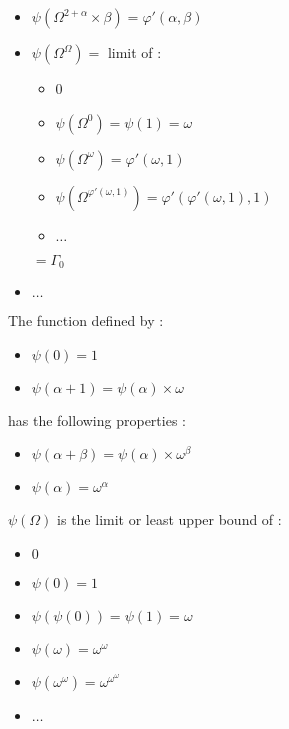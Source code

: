 \documentclass[10pt]{article}
\begin{document}
\begin{itemize}
\item \( \psi(\Omega^{2+\alpha} \times \beta) = \varphi'(\alpha,\beta) \)
\item \( \psi(\Omega^\Omega) = \) limit of : 
   \begin{itemize}
     \setlength{\itemsep}{1pt}
     \setlength{\parskip}{0pt}
     \setlength{\parsep}{0pt}
   \item 0
   \item \( \psi(\Omega^0) = \psi(1) = \omega \)
   \item \( \psi(\Omega^\omega) = \varphi'(\omega,1) \)
   \item \( \psi(\Omega^{\varphi'(\omega,1)}) = \varphi'(\varphi'(\omega,1),1) \)
   \item \( \ldots \)
   \end{itemize} 
   \( = \Gamma_0 \)
\item \( \ldots \)
\end{itemize}

\bigskip

The function defined by :

\begin{itemize}
     \setlength{\itemsep}{1pt}
     \setlength{\parskip}{0pt}
     \setlength{\parsep}{0pt}
\item \( \psi(0) = 1 \)
\item \( \psi(\alpha+1) = \psi(\alpha) \times \omega \)
\end{itemize}

has the following properties :

\begin{itemize}
     \setlength{\itemsep}{1pt}
     \setlength{\parskip}{0pt}
     \setlength{\parsep}{0pt}
\item \( \psi(\alpha+\beta)=\psi(\alpha) \times \omega^\beta \)
\item \( \psi(\alpha) = \omega^\alpha \)
\end{itemize}

\( \psi(\Omega) \) is the limit or least upper bound of :

\begin{itemize}
     \setlength{\itemsep}{1pt}
     \setlength{\parskip}{0pt}
     \setlength{\parsep}{0pt}
\item \( 0 \)
\item \( \psi(0) = 1 \)
\item \( \psi(\psi(0)) = \psi(1) = \omega \)
\item \( \psi(\omega) = \omega^\omega \)
\item \( \psi(\omega^\omega) = \omega^{\omega^\omega} \)
\item \( \ldots \)
\end{itemize}
\end{document}
